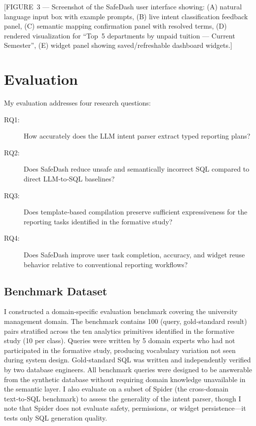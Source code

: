 \documentclass[11pt]{article}
\begin{document}
[FIGURE 3 — Screenshot of the SafeDash user interface showing: (A) natural language input box with example prompts, (B) live intent classification feedback panel, (C) semantic mapping confirmation panel with resolved terms, (D) rendered visualization for ``Top 5 departments by unpaid tuition — Current Semester'', (E) widget panel showing saved/refreshable dashboard widgets.]

\section{Evaluation}
My evaluation addresses four research questions:
\begin{description}
  \item[RQ1:] How accurately does the LLM intent parser extract typed reporting plans?
  \item[RQ2:] Does SafeDash reduce unsafe and semantically incorrect SQL compared to direct LLM‑to‑SQL baselines?
  \item[RQ3:] Does template‑based compilation preserve sufficient expressiveness for the reporting tasks identified in the formative study?
  \item[RQ4:] Does SafeDash improve user task completion, accuracy, and widget reuse behavior relative to conventional reporting workflows?
\end{description}

\subsection{Benchmark Dataset}
I constructed a domain‑specific evaluation benchmark covering the university management domain. The benchmark contains 100 (query, gold‑standard result) pairs stratified across the ten analytics primitives identified in the formative study (10 per class). Queries were written by 5 domain experts who had not participated in the formative study, producing vocabulary variation not seen during system design. Gold‑standard SQL was written and independently verified by two database engineers. All benchmark queries were designed to be answerable from the synthetic database without requiring domain knowledge unavailable in the semantic layer. I also evaluate on a subset of Spider (the cross‑domain text‑to‑SQL benchmark) to assess the generality of the intent parser, though I note that Spider does not evaluate safety, permissions, or widget persistence—it tests only SQL generation quality.
\end{document}
